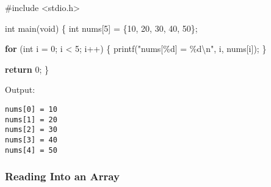 \documentclass[
  letterpaper,
  DIV=11,
  numbers=noendperiod]{scrreprt}
\newenvironment{Shaded}{\begin{snugshade}}{\end{snugshade}}
\newcommand{\ControlFlowTok}[1]{\textcolor[rgb]{0.00,0.23,0.31}{\textbf{#1}}}
\newcommand{\DataTypeTok}[1]{\textcolor[rgb]{0.68,0.00,0.00}{#1}}
\newcommand{\DecValTok}[1]{\textcolor[rgb]{0.68,0.00,0.00}{#1}}
\newcommand{\ImportTok}[1]{\textcolor[rgb]{0.00,0.46,0.62}{#1}}
\newcommand{\NormalTok}[1]{\textcolor[rgb]{0.00,0.23,0.31}{#1}}
\newcommand{\OperatorTok}[1]{\textcolor[rgb]{0.37,0.37,0.37}{#1}}
\newcommand{\PreprocessorTok}[1]{\textcolor[rgb]{0.68,0.00,0.00}{#1}}
\newcommand{\SpecialCharTok}[1]{\textcolor[rgb]{0.37,0.37,0.37}{#1}}
\newcommand{\StringTok}[1]{\textcolor[rgb]{0.13,0.47,0.30}{#1}}
\begin{document}
\begin{Shaded}
\begin{Highlighting}[]
\PreprocessorTok{\#include }\ImportTok{\textless{}stdio.h\textgreater{}}

\DataTypeTok{int}\NormalTok{ main}\OperatorTok{(}\DataTypeTok{void}\OperatorTok{)} \OperatorTok{\{}
    \DataTypeTok{int}\NormalTok{ nums}\OperatorTok{[}\DecValTok{5}\OperatorTok{]} \OperatorTok{=} \OperatorTok{\{}\DecValTok{10}\OperatorTok{,} \DecValTok{20}\OperatorTok{,} \DecValTok{30}\OperatorTok{,} \DecValTok{40}\OperatorTok{,} \DecValTok{50}\OperatorTok{\};}

    \ControlFlowTok{for} \OperatorTok{(}\DataTypeTok{int}\NormalTok{ i }\OperatorTok{=} \DecValTok{0}\OperatorTok{;}\NormalTok{ i }\OperatorTok{\textless{}} \DecValTok{5}\OperatorTok{;}\NormalTok{ i}\OperatorTok{++)} \OperatorTok{\{}
\NormalTok{        printf}\OperatorTok{(}\StringTok{"nums[}\SpecialCharTok{\%d}\StringTok{] = }\SpecialCharTok{\%d\textbackslash{}n}\StringTok{"}\OperatorTok{,}\NormalTok{ i}\OperatorTok{,}\NormalTok{ nums}\OperatorTok{[}\NormalTok{i}\OperatorTok{]);}
    \OperatorTok{\}}

    \ControlFlowTok{return} \DecValTok{0}\OperatorTok{;}
\OperatorTok{\}}
\end{Highlighting}
\end{Shaded}

Output:

\begin{verbatim}
nums[0] = 10
nums[1] = 20
nums[2] = 30
nums[3] = 40
nums[4] = 50
\end{verbatim}

\subsubsection{Reading Into an Array}\label{reading-into-an-array}
\end{document}
